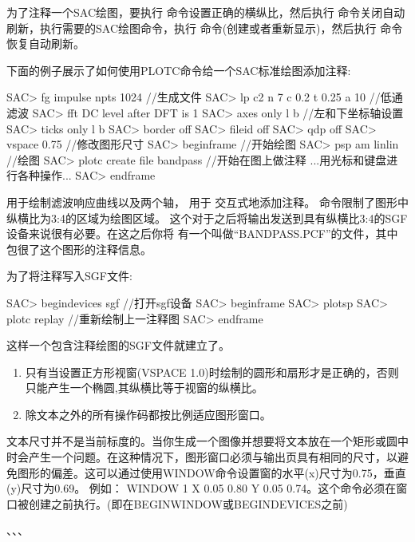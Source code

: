 为了注释一个SAC绘图，要执行  命令设置正确的横纵比，然后执行  命令关闭自动刷新，执行需要的SAC绘图命令，执行  命令(创建或者重新显示)，然后执行  命令恢复自动刷新。

下面的例子展示了如何使用PLOTC命令给一个SAC标准绘图添加注释:
\begin{SACCode}
SAC> fg impulse npts 1024                      //生成文件
SAC> lp c2 n 7 c 0.2 t 0.25 a 10               //低通滤波
SAC> fft
 DC level after DFT is 1
SAC> axes only l b                             //左和下坐标轴设置
SAC> ticks only l b
SAC> border off
SAC> fileid off
SAC> qdp off
SAC> vspace 0.75                              //修改图形尺寸
SAC> beginframe                               //开始绘图
SAC> psp am linlin                            //绘图
SAC> plotc create file bandpass               //开始在图上做注释
...用光标和键盘进行各种操作...
SAC> endframe
\end{SACCode}

 用于绘制滤波响应曲线以及两个轴， 用于
交互式地添加注释。 命令限制了图形中纵横比为3:4的区域为绘图区域。
这个对于之后将输出发送到具有纵横比3:4的SGF设备来说很有必要。在这之后你将
有一个叫做``BANDPASS.PCF''的文件，其中包很了这个图形的注释信息。

为了将注释写入SGF文件:
\begin{SACCode}
SAC> begindevices sgf                       //打开sgf设备
SAC> beginframe
SAC> plotsp
SAC> plotc replay                           //重新绘制上一注释图
SAC> endframe
\end{SACCode}
这样一个包含注释绘图的SGF文件就建立了。

\begin{enumerate}
\item 只有当设置正方形视窗(VSPACE 1.0)时绘制的圆形和扇形才是正确的，否则只能产生一个椭圆,其纵横比等于视窗的纵横比。
\item 除文本之外的所有操作码都按比例适应图形窗口。
\end{enumerate}
文本尺寸并不是当前标度的。当你生成一个图像并想要将文本放在一个矩形或圆中时会产生一个问题。在这种情况下，图形窗口必须与输出页具有相同的尺寸，以避免图形的偏差。这可以通过使用WINDOW命令设置窗的水平(x)尺寸为0.75，垂直(y)尺寸为0.69。
例如： WINDOW 1 X 0.05 0.80 Y 0.05 0.74。这个命令必须在窗口被创建之前执行。(即在BEGINWINDOW或BEGINDEVICES之前)

、、、

